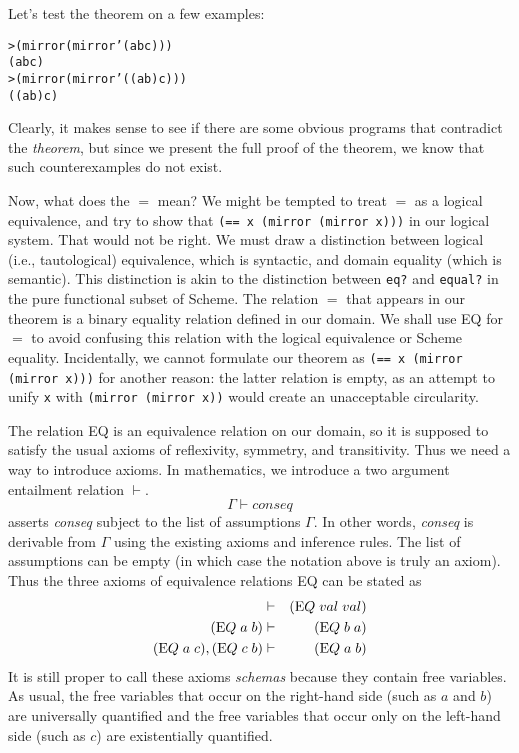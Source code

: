 Let's test the theorem on a few examples:

\begin{alltt}
> (mirror (mirror '(a b c)))
(a b c)
> (mirror (mirror '((a b) c)))
((a b) c)
\end{alltt}

Clearly, it makes sense to see if there are some obvious programs that
contradict the \emph{theorem}, but since we present the full proof of
the theorem, we know that such counterexamples do not exist.

Now, what does the $=$ mean?  We might be tempted to treat $=$ as a logical
equivalence, and try to show that \texttt{(== x (mirror (mirror x)))} in
our logical system. That would not be right. We must draw a distinction
between logical (i.e., tautological) equivalence, which is syntactic, and
domain equality (which is semantic). This distinction is akin to the
distinction between \texttt{eq?} and \texttt{equal?} in the pure functional
subset of Scheme. The relation $=$ that appears in our theorem is a binary
equality relation defined in our domain. We shall use EQ for $=$ to avoid
confusing this relation with the logical equivalence or Scheme
equality. Incidentally, we cannot formulate our theorem as \texttt{(== x
(mirror (mirror x)))} for another reason: the latter relation is empty, as
an attempt to unify \texttt{x} with \texttt{(mirror (mirror x))} would
create an unacceptable circularity.

The relation EQ is an equivalence relation on our domain, so it is
supposed to satisfy the usual axioms of reflexivity, symmetry, and
transitivity. Thus we need a way to introduce axioms. In mathematics, we
introduce a two argument entailment relation $\vdash$.
	$$\Gamma \vdash conseq$$
asserts \emph{conseq} subject to the list of assumptions $\Gamma$.  In
other words, \emph{conseq} is derivable from $\Gamma$ using the existing axioms
and inference rules. The list of assumptions can be empty (in which
case the notation above is truly an axiom). Thus the three axioms of
equivalence relations EQ can be stated as
\begin{eqnarray*}
&\vdash&({\textrm EQ} \; val \; val)\\
({\textrm EQ} \; a \; b)&\vdash&({\textrm EQ} \; b \; a)\\
({\textrm EQ} \; a \; c), ({\textrm EQ} \; c \; b)&\vdash&({\textrm EQ} \; a \; b)
\end{eqnarray*}
It is still proper to call these axioms \emph{schemas} because they contain free
variables. As usual, the free variables that occur on the
right-hand side (such as $a$ and $b$) are universally quantified and
the free variables that occur only on the left-hand side (such as $c$) are
existentially quantified.

